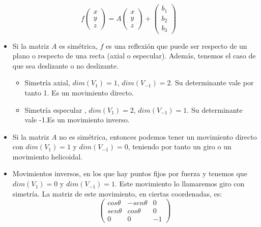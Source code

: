 \documentclass[11pt, a4paper]{article}
\newif\IfInSansMode
\theoremstyle{theorem-style}
\theoremstyle{definition-style}
\theoremstyle{remark-style}
\theoremstyle{example-style}
\begin{document}
\[
  f \begin{pmatrix}
    x\\
    y\\
    z
  \end{pmatrix} = A\begin{pmatrix}
    x\\
    y\\
    z
  \end{pmatrix} + \begin{pmatrix}
    b_1\\
    b_2\\
    b_3
  \end{pmatrix}
\]

\begin{itemize}
\item Si la matriz $A$ es simétrica, $f$ es una reflexión que puede ser respecto de un plano o respecto de una recta (axial o especular). Además, tenemos el caso de que sea deslizante o no deslizante.

  \begin{itemize}
  \item Simetría axial, $dim(V_1) = 1$, $dim(V_{-1}) =2$. Su determinante vale por tanto 1. Es un movimiento directo.
  \item Simetría especular , $dim(V_1) = 2$, $dim(V_{-1}) =1$. Su determinante vale -1.Es un movimiento inverso.
  \end{itemize}

\item Si la matriz $A$ no es simétrica, entonces podemos tener un movimiento directo con $dim(V_1) = 1$ y $dim(V_{-1})=0$, teniendo por tanto un giro o un movimiento helicoidal.
  
\item Movimientos inversos, en los que hay puntos fijos por fuerza y tenemos que $dim(V_1) = 0$ y $dim(V_{-1}) = 1$. Este movimiento lo llamaremos giro con simetría. La matriz de este movimiento, en ciertas coordenadas, es:
  \[
    \begin{pmatrix}
      cos \theta & -sen\theta  & 0\\
      sen\theta & cos\theta  & 0\\
      0 & 0 & -1
    \end{pmatrix} 
  \]
\end{itemize}
\end{document}
